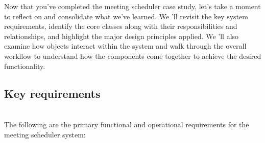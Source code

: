 

Now that you've completed the meeting scheduler case study, let's take a moment to reflect on and consolidate what we've learned. We 'll revisit the key system requirements, identify the core classes along with their responsibilities and relationships, and highlight the major design principles applied. We
'll also examine how objects interact within the system and walk through the overall workflow to understand how the components come together to achieve the desired functionality.

\subsection{Key requirements}\label{Esc7TnxY3ARMPBTaK2weO}
\\
The following are the primary functional and operational requirements for the meeting scheduler system:

